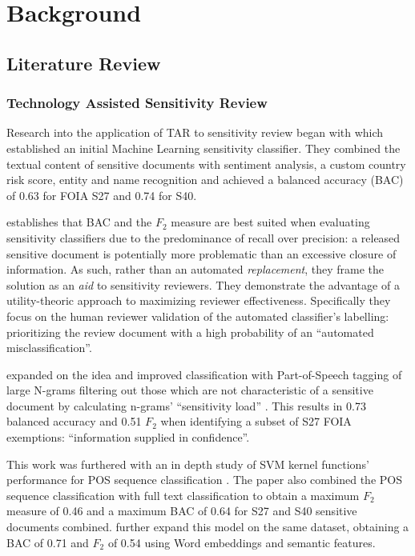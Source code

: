 \documentclass[\version]{l4proj}
\begin{document}
\chapter{Background}

\section{Literature Review}

\subsection{Technology Assisted Sensitivity Review}

\autocite{sanchezDetectingSensitiveInformation2012}

Research into the application of TAR to sensitivity review began with \textcite{mcdonaldClassifierDigitalSensitivity2014} which established an initial Machine Learning sensitivity classifier.
They combined the textual content of sensitive documents with sentiment analysis, a custom country risk score, entity and name recognition and achieved a balanced accuracy (BAC) of 0.63 for FOIA S27 and 0.74 for S40.

\textcite{berardiSemiAutomatedTextClassification2015} establishes that BAC and the \(F_{2}\) measure are best suited when evaluating sensitivity classifiers due to the predominance of recall over precision: a released sensitive document is potentially more problematic than an excessive closure of information.
As such, rather than an automated \textit{replacement}, they frame the solution as an \textit{aid} to sensitivity reviewers.
They demonstrate the advantage of a utility-theoric approach to maximizing reviewer effectiveness.
Specifically they focus on the human reviewer validation of the automated classifier's labelling: prioritizing the review document with a high probability of an ``automated misclassification''.

\textcite{mcdonaldUsingPartofSpeechNgrams2015} expanded on the idea and improved classification with Part-of-Speech tagging of large N-grams filtering out those which are not characteristic of a sensitive document by calculating n-grams' ``sensitivity load'' \autocite[2]{mcdonaldUsingPartofSpeechNgrams2015}.
This results in 0.73 balanced accuracy and 0.51 \(F_{2}\) when identifying a subset of S27 FOIA exemptions: ``information supplied in confidence''.

This work was furthered with an in depth study of SVM kernel functions' performance for POS sequence classification \autocite{mcdonaldStudySVMKernel2017}.
The paper also combined the POS sequence classification with full text classification to obtain a maximum \(F_{2}\) measure of 0.46 and a maximum BAC of 0.64 for S27 and S40 sensitive documents combined.
\autocite{mcdonaldEnhancingSensitivityClassification2017} further expand this model on the same dataset, obtaining a BAC of 0.71 and \(F_{2}\) of 0.54 using Word embeddings and semantic features.
\end{document}
